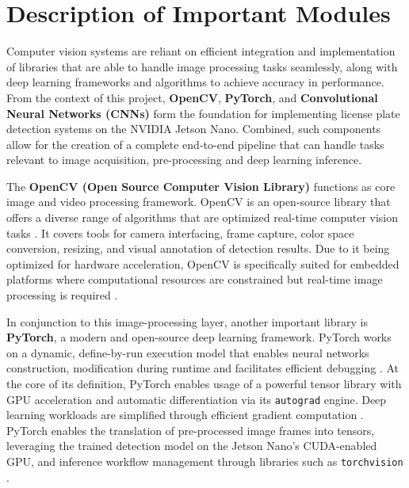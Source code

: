 %
%
%

\chapter{Description of Important Modules}


\noindent
Computer vision systems are reliant on efficient integration and implementation of libraries that are able to handle image processing tasks seamlessly, along with deep learning frameworks and algorithms to achieve accuracy in performance. From the context of this project, \textbf{OpenCV}, \textbf{PyTorch}, and \textbf{Convolutional Neural Networks (CNNs)} form the foundation for implementing license plate detection systems on the NVIDIA Jetson Nano. Combined, such components allow for the creation of a complete end-to-end pipeline that can handle tasks relevant to image acquisition, pre-processing and deep learning inference.\newline

The \textbf{OpenCV (Open Source Computer Vision Library)} functions as core image and video processing framework. OpenCV is an open-source library that offers a diverse range of algorithms that are optimized real-time computer vision tasks \cite{Bradski:2000,opencv_wiki}. It covers tools for camera interfacing, frame capture, color space conversion, resizing, and visual annotation of detection results. Due to it being optimized for hardware acceleration, OpenCV is specifically suited for embedded platforms where computational resources are constrained but real-time image processing is required \cite{opencv_lfs,opencv_on_wheels}.\newline

In conjunction to this image-processing layer, another important library is \textbf{PyTorch}, a modern and open-source deep learning framework. PyTorch works on a dynamic, define-by-run execution model that enables neural networks construction, modification during runtime and facilitates efficient debugging \cite{paszke2019pytorch}. At the core of its definition, PyTorch enables usage of a powerful tensor library with GPU acceleration and automatic differentiation via its \texttt{autograd} engine. Deep learning workloads are simplified through efficient gradient computation \cite{pytorchdocs}. PyTorch enables the translation of pre-processed image frames into tensors, leveraging the trained detection model on the Jetson Nano’s CUDA-enabled GPU, and inference workflow management through libraries such as \texttt{torchvision} \cite{jetsonpytorch}. \newline

